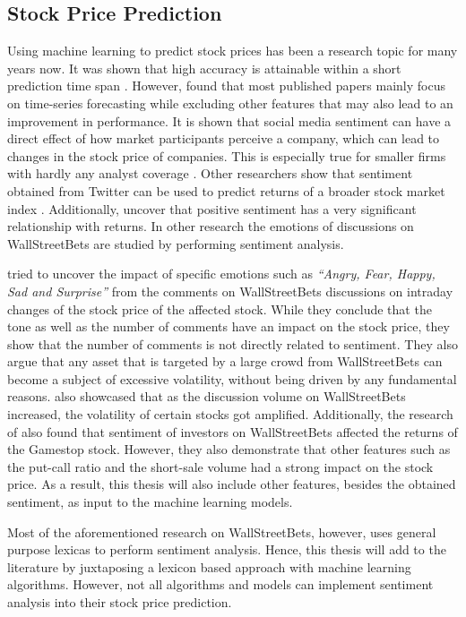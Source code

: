 \documentclass[11pt, a4paper]{article}
\begin{document}
\subsection{Stock Price Prediction}

Using machine learning to predict stock prices has been a research topic for many years now. It was shown that high accuracy is attainable within
a short prediction time span \citep{schoneburg1990prediction}. However, \cite{gooijer2006forecasting} found that most published papers mainly focus on time-series forecasting while excluding other features
that may also lead to an improvement in performance.
It is shown that social media sentiment can have a 
direct effect of how market participants perceive a company, which can lead to changes in the stock price of companies. This is especially true for smaller 
firms with hardly any analyst coverage \citep{feng2019824}. Other researchers show that sentiment obtained from Twitter can be used to predict returns of a 
broader stock market index \citep{gu2020twtrsentiment}.
Additionally, \cite{werner2004talknoise} uncover that positive sentiment has a very significant relationship with returns.
In other research the emotions of discussions on WallStreetBets are studied by performing sentiment analysis. 

\cite{long2021LikeTheStock} tried to uncover the impact of specific emotions such as \emph{“Angry, Fear, Happy, Sad and Surprise”} from the comments on 
WallStreetBets discussions on intraday changes of the stock price of the affected stock. While they conclude that the tone as well as the number of 
comments have an impact on the stock price, they show that the number of comments is not directly related to sentiment.
They also argue that any asset that is targeted by a large crowd from WallStreetBets can become a subject 
of excessive volatility, without being driven by any fundamental reasons.
\cite{lyocsa2021yolotrading} also showcased that as the discussion volume on WallStreetBets increased, the volatility of certain stocks got amplified. 
Additionally, the research of \cite{umar2021ataleofcompanyfundamentals} also found that sentiment of investors on WallStreetBets affected the returns of the Gamestop stock. 
However, they also demonstrate that other features such as the put-call ratio and the short-sale volume had a strong impact on the stock price. As a result, this thesis
will also include other features, besides the obtained sentiment, as input to the machine learning models.

Most of the aforementioned research on WallStreetBets, however, uses general purpose lexicas to perform sentiment analysis. Hence, this thesis will add to the literature 
by juxtaposing a lexicon based approach with machine learning algorithms.
However, not all algorithms and models can implement sentiment analysis into their stock price prediction.
\end{document}
